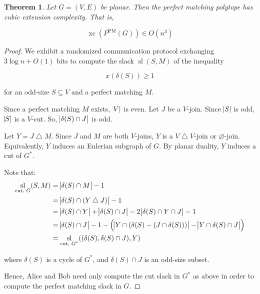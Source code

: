 \documentclass{article}
\newtheorem{theorem}{Theorem}
\DeclareMathOperator{\xc}{xc}
\DeclareMathOperator{\Sl}{sl}
\begin{document}
\begin{theorem}
	Let $G=(V,E)$ be planar. Then the perfect matching polytope has
	cubic extension complexity. That is,

	$$\xc(P^{\text{PM}}(G)) \in O(n^3)$$
\end{theorem}
\begin{proof}
	We exhibit a randomized communication protocol exchanging $3\log n+O(1)$
	bits to compute the slack $\Sl(S, M)$ of the inequality
	
	$$ x(\delta(S)) \geq 1$$

	for an odd-size $S\subseteq V$ and a perfect matching $M$.

	Since a perfect matching $M$ exists, $\abs{V}$ is even.
	Let $J$ be a $V$-join. Since $\abs{S}$ is odd, 
	$\abs{S}$ is a $V$-cut. 
	So, $\abs{\delta(S)\cap J}$ is odd.

	Let $Y = J\bigtriangleup M$. Since $J$ and $M$ are both $V$-joins,
	$Y$ is a $V\bigtriangleup V$-join or $\varnothing$-join.
	Equivalently, $Y$ induces an Eulerian subgraph of $G$.
	By planar duality, $Y$ induces a cut of $G^*$.

	Note that:
	\begin{align*}
		\Sl_\text{cut, $G$}(S, M) &= \abs{\delta(S)\cap M} - 1 \\
		&= \abs{\delta(S)\cap (Y \bigtriangleup J)} - 1 \\
		&= \abs{\delta(S)\cap Y} + \abs{\delta(S)\cap J} - 2\abs{\delta(S)\cap Y \cap J} - 1 \\
		&= \abs{\delta(S)\cap J} - 1 - \del{\abs{Y\cap(\delta(S)-(J\cap\delta(S)))} - \abs{Y\cap\delta(S)\cap J}} \\
		&= \Sl_\text{cut, $G^*$}((\delta(S), \delta(S)\cap J), Y) 
	\end{align*}

	where $\delta(S)$ is a cycle of $G^*$,
	and $\delta(S)\cap J$ is an odd-size subset.

	Hence, Alice and Bob need only compute the cut slack in $G^*$ as above
	in order to compute the perfect matching slack in $G$.
\end{proof}
\end{document}
